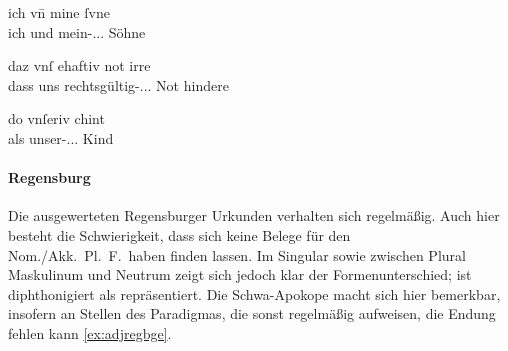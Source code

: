\begin{exe}
\ex \label{ex:adjnuern}
	\begin{xlist}
	\ex \label{ex:adjnuern_1}
		\gll ich vn̄ mine ſvne \\
			ich und mein-\Nom.\Pl.\MascM.\St{} Söhne \\
		\begin{taggedline}{\parencites(Kl.~Seligenporten, Kr.~Neumarkt in der Oberpfalz, 1299)[\pno~3428, 525.15]{cao4}}
		\trans {}
		\end{taggedline}

	\ex \label{ex:adjnuern_2}
		\gll daz vnſ ehaftiv not irre \\
			dass uns rechtsgültig-\Nom.\Sg.\FemI.\St{} Not hindere \\
		\begin{taggedline}{\parencites(Nürnberg, 1287)[\pno~949, 301.12--13]{cao2}}
		\trans {}
		\end{taggedline}

	\ex \label{ex:adjnuern_3}
		\gll do vnſeriv chint \\
			als unser-\Nom.\Pl.\NeutX.\St{} Kind \\
		\begin{taggedline}{\parencites(Nürnberg, 1294)[1972~AB.225.17--18]{cao3}}
		\trans {}
		\end{taggedline}
	\end{xlist}
\end{exe}

\paragraph{Regensburg}
\label{par:adjregensburg}
Die ausgewerteten Regensburger Urkunden verhalten sich regelmäßig. Auch hier
besteht die Schwierigkeit, dass sich keine Belege für den Nom./Akk.\ Pl.\ F.\
haben finden lassen. Im Singular sowie zwischen Plural Maskulinum und Neutrum
zeigt sich jedoch klar der Formenunterschied; \norm{iu} ist diphthonigiert als
\lit{eu} repräsentiert. Die Schwa-Apokope
\autocites{lindgren1953}[109--111]{paul2007} macht sich hier bemerkbar,
insofern an Stellen des Paradigmas, die sonst regelmäßig \norm{-e} aufweisen,
die Endung fehlen kann \cref{ex:adjregbge}.%

